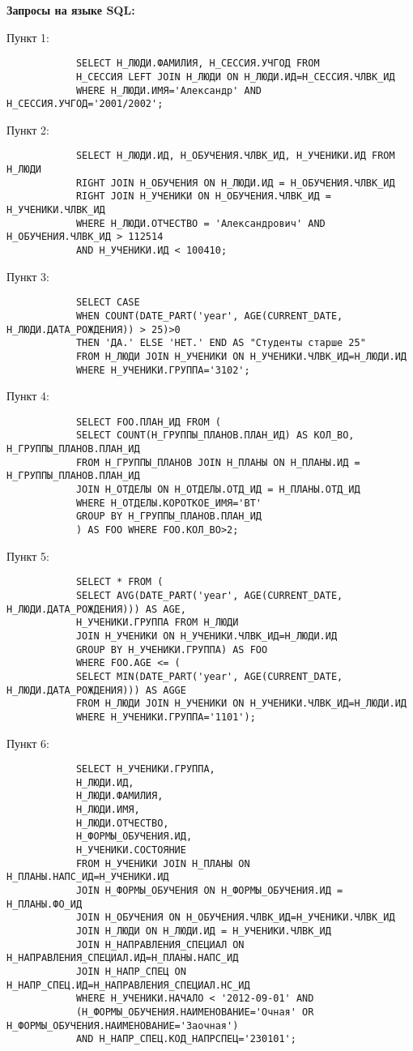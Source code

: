 \documentclass[11pt,a4paper]{article}
\begin{document}
\begin{flushleft}
		\textbf{{\large Запросы на языке SQL:}}
		
		Пункт 1:
		\begin{verbatim}
			SELECT Н_ЛЮДИ.ФАМИЛИЯ, Н_СЕССИЯ.УЧГОД FROM
			Н_СЕССИЯ LEFT JOIN Н_ЛЮДИ ON Н_ЛЮДИ.ИД=Н_СЕССИЯ.ЧЛВК_ИД 
			WHERE Н_ЛЮДИ.ИМЯ='Александр' AND Н_СЕССИЯ.УЧГОД='2001/2002';
		\end{verbatim}
		
		Пункт 2:
		\begin{verbatim}
			SELECT Н_ЛЮДИ.ИД, Н_ОБУЧЕНИЯ.ЧЛВК_ИД, Н_УЧЕНИКИ.ИД FROM Н_ЛЮДИ 
			RIGHT JOIN Н_ОБУЧЕНИЯ ON Н_ЛЮДИ.ИД = Н_ОБУЧЕНИЯ.ЧЛВК_ИД 
			RIGHT JOIN Н_УЧЕНИКИ ON Н_ОБУЧЕНИЯ.ЧЛВК_ИД = Н_УЧЕНИКИ.ЧЛВК_ИД 
			WHERE Н_ЛЮДИ.ОТЧЕСТВО = 'Александрович' AND Н_ОБУЧЕНИЯ.ЧЛВК_ИД > 112514 
			AND Н_УЧЕНИКИ.ИД < 100410;
		\end{verbatim}
		
		Пункт 3:
		\begin{verbatim}
			SELECT CASE
			WHEN COUNT(DATE_PART('year', AGE(CURRENT_DATE, Н_ЛЮДИ.ДАТА_РОЖДЕНИЯ)) > 25)>0 
			THEN 'ДА.' ELSE 'НЕТ.' END AS "Студенты старше 25" 
			FROM Н_ЛЮДИ JOIN Н_УЧЕНИКИ ON Н_УЧЕНИКИ.ЧЛВК_ИД=Н_ЛЮДИ.ИД 
			WHERE Н_УЧЕНИКИ.ГРУППА='3102';
		\end{verbatim}
		
		Пункт 4:
		\begin{verbatim}
			SELECT FOO.ПЛАН_ИД FROM (
			SELECT COUNT(Н_ГРУППЫ_ПЛАНОВ.ПЛАН_ИД) AS КОЛ_ВО, Н_ГРУППЫ_ПЛАНОВ.ПЛАН_ИД 
			FROM Н_ГРУППЫ_ПЛАНОВ JOIN Н_ПЛАНЫ ON Н_ПЛАНЫ.ИД = Н_ГРУППЫ_ПЛАНОВ.ПЛАН_ИД 
			JOIN Н_ОТДЕЛЫ ON Н_ОТДЕЛЫ.ОТД_ИД = Н_ПЛАНЫ.ОТД_ИД 
			WHERE Н_ОТДЕЛЫ.КОРОТКОЕ_ИМЯ='ВТ' 
			GROUP BY Н_ГРУППЫ_ПЛАНОВ.ПЛАН_ИД
			) AS FOO WHERE FOO.КОЛ_ВО>2;
		\end{verbatim}
		
		Пункт 5:
		\begin{verbatim}
			SELECT * FROM (
			SELECT AVG(DATE_PART('year', AGE(CURRENT_DATE, Н_ЛЮДИ.ДАТА_РОЖДЕНИЯ))) AS AGE,
			Н_УЧЕНИКИ.ГРУППА FROM Н_ЛЮДИ 
			JOIN Н_УЧЕНИКИ ON Н_УЧЕНИКИ.ЧЛВК_ИД=Н_ЛЮДИ.ИД 
			GROUP BY Н_УЧЕНИКИ.ГРУППА) AS FOO 
			WHERE FOO.AGE <= (
			SELECT MIN(DATE_PART('year', AGE(CURRENT_DATE, Н_ЛЮДИ.ДАТА_РОЖДЕНИЯ))) AS AGGE 
			FROM Н_ЛЮДИ JOIN Н_УЧЕНИКИ ON Н_УЧЕНИКИ.ЧЛВК_ИД=Н_ЛЮДИ.ИД 
			WHERE Н_УЧЕНИКИ.ГРУППА='1101');
		\end{verbatim}
		
		Пункт 6:
		\begin{verbatim}
			SELECT Н_УЧЕНИКИ.ГРУППА,
			Н_ЛЮДИ.ИД,
			Н_ЛЮДИ.ФАМИЛИЯ,
			Н_ЛЮДИ.ИМЯ,
			Н_ЛЮДИ.ОТЧЕСТВО,
			Н_ФОРМЫ_ОБУЧЕНИЯ.ИД,
			Н_УЧЕНИКИ.СОСТОЯНИЕ 
			FROM Н_УЧЕНИКИ JOIN Н_ПЛАНЫ ON Н_ПЛАНЫ.НАПС_ИД=Н_УЧЕНИКИ.ИД 
			JOIN Н_ФОРМЫ_ОБУЧЕНИЯ ON Н_ФОРМЫ_ОБУЧЕНИЯ.ИД = Н_ПЛАНЫ.ФО_ИД 
			JOIN Н_ОБУЧЕНИЯ ON Н_ОБУЧЕНИЯ.ЧЛВК_ИД=Н_УЧЕНИКИ.ЧЛВК_ИД 
			JOIN Н_ЛЮДИ ON Н_ЛЮДИ.ИД = Н_УЧЕНИКИ.ЧЛВК_ИД 
			JOIN Н_НАПРАВЛЕНИЯ_СПЕЦИАЛ ON Н_НАПРАВЛЕНИЯ_СПЕЦИАЛ.ИД=Н_ПЛАНЫ.НАПС_ИД 
			JOIN Н_НАПР_СПЕЦ ON Н_НАПР_СПЕЦ.ИД=Н_НАПРАВЛЕНИЯ_СПЕЦИАЛ.НС_ИД 
			WHERE Н_УЧЕНИКИ.НАЧАЛО < '2012-09-01' AND 
			(Н_ФОРМЫ_ОБУЧЕНИЯ.НАИМЕНОВАНИЕ='Очная' OR Н_ФОРМЫ_ОБУЧЕНИЯ.НАИМЕНОВАНИЕ='Заочная') 
			AND Н_НАПР_СПЕЦ.КОД_НАПРСПЕЦ='230101';
		\end{verbatim}
		

\end{flushleft}
\end{document}
